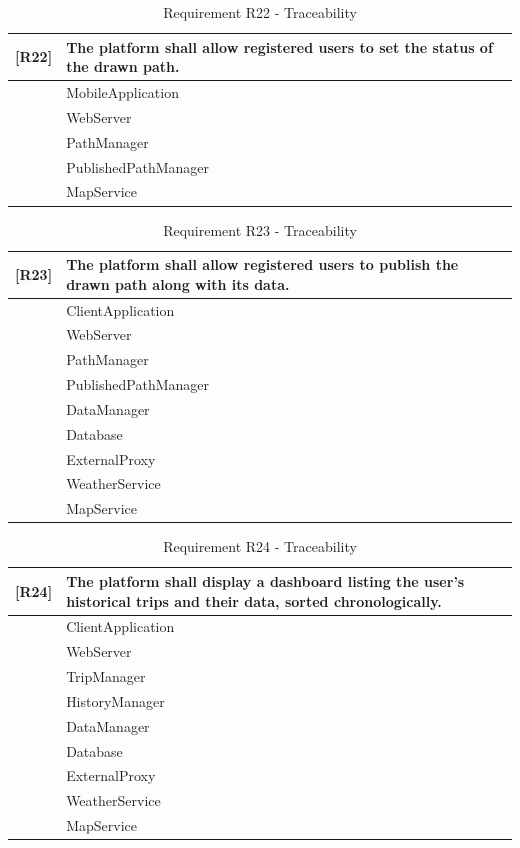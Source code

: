 \begin{table}[H]
    \centering
    \begin{tabular}{|p{1cm}|p{14cm}|}
    \hline
    \textbf{[R22]} & \textbf{The platform shall allow registered users to set the status of the drawn path.} \\ \hline
    [C1] & MobileApplication \\ \hline
    [C2] & WebServer \\ \hline
    [C7] & PathManager \\ \hline
    [C9] & PublishedPathManager \\ \hline
    [E2] & MapService \\ \hline
    \end{tabular}
    \caption{Requirement R22 - Traceability}
    \label{tab:RT22}
\end{table}

\begin{table}[H]
    \centering
    \begin{tabular}{|p{1cm}|p{14cm}|}
    \hline
    \textbf{[R23]} & \textbf{The platform shall allow registered users to publish the drawn path along with its data.} \\ \hline
    [C1] & ClientApplication \\ \hline
    [C2] & WebServer \\ \hline
    [C7] & PathManager \\ \hline
    [C9] & PublishedPathManager \\ \hline
    [C15] & DataManager\\ \hline
    [C16] & Database\\ \hline
    [C17] & ExternalProxy \\ \hline
    [E1] & WeatherService \\ \hline
    [E2] & MapService \\ \hline
    \end{tabular}
    \caption{Requirement R23 - Traceability}
    \label{tab:RT23}
\end{table}

\begin{table}[H]
    \centering
    \begin{tabular}{|p{1cm}|p{14cm}|}
    \hline
    \textbf{[R24]} & \textbf{The platform shall display a dashboard listing the user’s historical trips and their data, sorted
    chronologically.} \\ \hline
    [C1] & ClientApplication \\ \hline
    [C2] & WebServer \\ \hline
    [C11] & TripManager \\ \hline
    [C12] & HistoryManager \\ \hline
    [C15] & DataManager\\ \hline
    [C16] & Database\\ \hline
    [C17] & ExternalProxy \\ \hline
    [E1] & WeatherService \\ \hline
    [E2] & MapService \\ \hline
    \end{tabular}
    \caption{Requirement R24 - Traceability}
    \label{tab:RT24}
\end{table}

